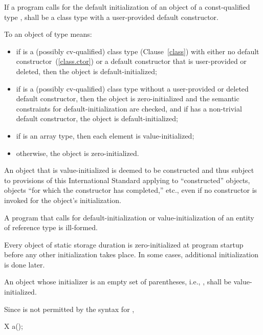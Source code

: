 If a program calls for the default initialization of an object of a
const-qualified type ,  shall be a class type with a user-provided default constructor.

\pnum
{}%
To
an object of type
means:

\begin{itemize}
\item
if
is a (possibly cv-qualified) class type (Clause~\ref{class}) with
either no default constructor~(\ref{class.ctor}) or a default
constructor that is user-provided or deleted, then the object is default-initialized;

\item
if
is a (possibly cv-qualified) class type without a
user-provided or deleted default constructor,
then the object is zero-initialized and the semantic constraints for
default-initialization are checked, and if  has a
non-trivial default constructor, the object is default-initialized;

\item
if
is an array type, then each element is value-initialized;

\item
otherwise, the object is zero-initialized.
\end{itemize}

An object that is value-initialized is deemed to be constructed and thus subject to
provisions of this International Standard applying to ``constructed'' objects, objects
``for which the constructor has completed,'' etc., even if no constructor is invoked
for the object's initialization.

\pnum
A program that calls for default-initialization
or value-initialization
of an entity
of reference type is ill-formed.

\pnum
\enternote Every
object of static storage duration is
zero-initialized at program startup before any other initialization
takes place.
In some cases, additional initialization is done later.
\exitnote

\pnum
An object whose initializer is an empty set of parentheses, i.e.,
\tcode{()},
shall be
value-initialized.

%
\enternote
Since
\tcode{()}
is not permitted by the syntax for
,

\begin{codeblock}
X a();
\end{codeblock}

